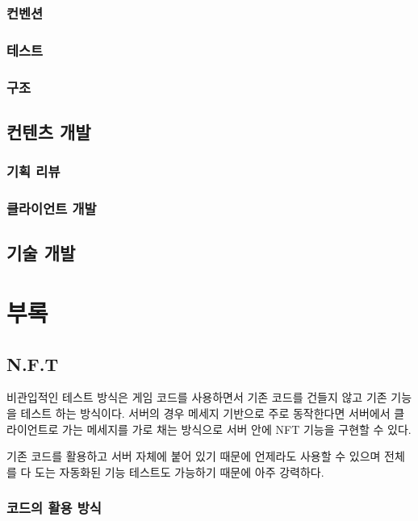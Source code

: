 \documentclass[chapter,kosection, 10.5pt, romanfixed, a4paper]{oblivoir}
\begin{document}
\subsection{컨벤션}

\subsection{테스트}

\subsection{구조}


\section{컨텐츠 개발}

\subsection{기획 리뷰}

\subsection{클라이언트 개발}


\section{기술 개발}

\chapter{부록}

\section{N.F.T}

비관입적인 테스트 방식은 게임 코드를 사용하면서 기존 코드를 건들지 않고 기존 기능을 
테스트 하는 방식이다. 서버의 경우 메세지 기반으로 주로 동작한다면 서버에서 클라이언트로 
가는 메세지를 가로 채는 방식으로 서버 안에 NFT 기능을 구현할 수 있다. 

기존 코드를 활용하고 서버 자체에 붙어 있기 때문에 언제라도 사용할 수 있으며 
전체를 다 도는 자동화된 기능 테스트도 가능하기 때문에 아주 강력하다. 

\subsection{코드의 활용 방식}
\end{document}
